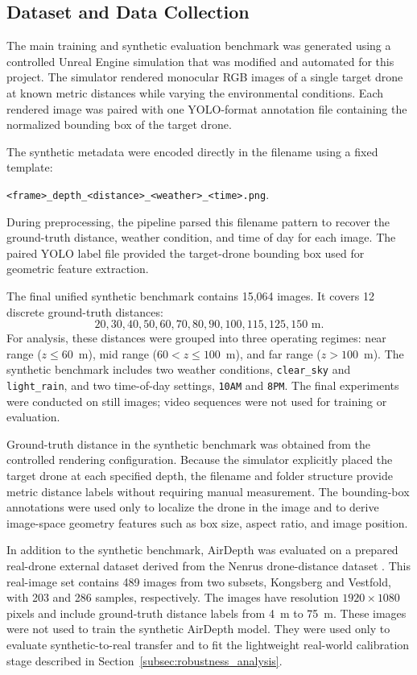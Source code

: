 \subsection{Dataset and Data Collection}
\label{subsec:evaluation_dataset}

The main training and synthetic evaluation benchmark was generated using a
controlled Unreal Engine simulation that was modified and automated for this
project. The simulator rendered monocular \ac{RGB} images of a single target
drone at known metric distances while varying the environmental conditions.
Each rendered image was paired with one YOLO-format annotation file containing
the normalized bounding box of the target drone.

The synthetic metadata were encoded directly in the filename using a fixed
template:
\begin{center}
\small
\texttt{<frame>\_depth\_<distance>\_<weather>\_<time>.png}.
\end{center}
During preprocessing, the pipeline parsed this filename pattern to recover the
ground-truth distance, weather condition, and time of day for each image. The
paired YOLO label file provided the target-drone bounding box used for
geometric feature extraction.

The final unified synthetic benchmark contains 15,064 images. It covers 12
discrete ground-truth distances:
\[
20, 30, 40, 50, 60, 70, 80, 90, 100, 115, 125, 150 \text{ m}.
\]
For analysis, these distances were grouped into three operating regimes:
near range ($z \leq 60$~m), mid range ($60 < z \leq 100$~m), and far range
($z > 100$~m). The synthetic benchmark includes two weather conditions,
\texttt{clear\_sky} and \texttt{light\_rain}, and two time-of-day settings,
\texttt{10AM} and \texttt{8PM}. The final experiments were conducted on still
images; video sequences were not used for training or evaluation.

Ground-truth distance in the synthetic benchmark was obtained from the
controlled rendering configuration. Because the simulator explicitly placed the
target drone at each specified depth, the filename and folder structure provide
metric distance labels without requiring manual measurement. The bounding-box
annotations were used only to localize the drone in the image and to derive
image-space geometry features such as box size, aspect ratio, and image
position.

In addition to the synthetic benchmark, AirDepth was evaluated on a prepared
real-drone external dataset derived from the Nenrus drone-distance dataset
\cite{nenrus_drone_distance_dataset}. This real-image set contains 489 images
from two subsets, Kongsberg and Vestfold, with 203 and 286 samples,
respectively. The images have resolution $1920 \times 1080$ pixels and include
ground-truth distance labels from 4~m to 75~m. These images were not used to
train the synthetic AirDepth model. They were used only to evaluate
synthetic-to-real transfer and to fit the lightweight real-world calibration
stage described in Section~\ref{subsec:robustness_analysis}.


